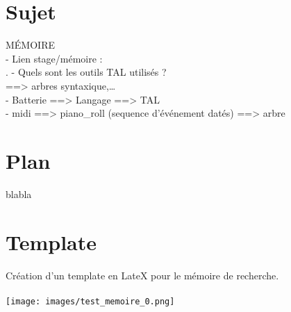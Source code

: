 \section{Sujet}
MÉMOIRE\\
- Lien stage/mémoire :\\.
- Quels sont les outils TAL utilisés ?\\
==> arbres syntaxique,…\\
- Batterie ==> Langage ==> TAL\\
- midi ==> piano\_roll (sequence d’événement datés) ==> arbre
\section{Plan}
blabla
\section{Template}
Création d’un template en LateX pour le mémoire de recherche.\\\\
\texttt{[image: images/test\_memoire\_0.png]}\\